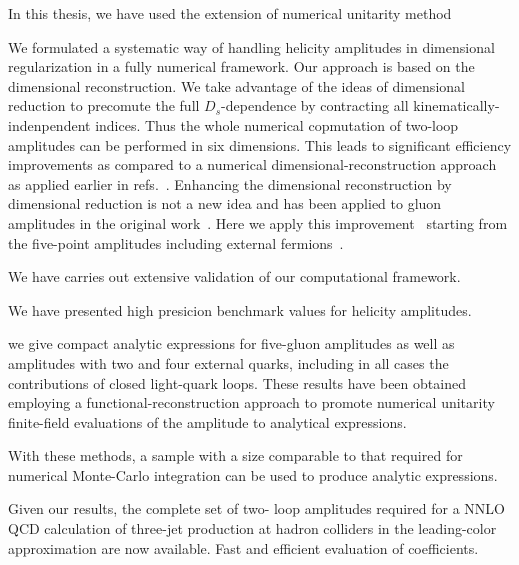 In this thesis, we have used the extension of numerical unitarity method  



We formulated a systematic way of handling helicity amplitudes in dimensional regularization in a fully numerical framework.
Our approach is based on the dimensional reconstruction. We take advantage of the ideas of dimensional reduction
to precomute the full $D_s$-dependence by contracting all kinematically-indenpendent indices.
Thus the whole numerical copmutation  of two-loop amplitudes can be performed in six dimensions.
This leads to
significant efficiency improvements as compared to a numerical dimensional-reconstruction
approach~\cite{Giele:2008ve,Ellis:2008ir, Boughezal:2011br} as applied earlier
in refs.~\cite{Abreu:2017xsl,Abreu:2017hqn,Badger:2018gip,Abreu:2018jgq}.
Enhancing the dimensional reconstruction by dimensional reduction 
is not a new idea and has been applied to gluon amplitudes in
the original work~\cite{Giele:2008ve}.
Here we apply this improvement~\cite{Anger:2018ove}
starting from the five-point amplitudes including external fermions~\cite{Abreu:2018jgq}.  


We have carries out extensive validation of our computational framework.

We have presented high presicion benchmark values for helicity amplitudes.

 we give compact
analytic expressions for five-gluon amplitudes as well as amplitudes with two and four
external quarks, including in all cases the contributions of closed light-quark loops.
These
results have been obtained employing a functional-reconstruction approach to promote
numerical unitarity  finite-field evaluations of the amplitude to analytical expressions.

With these methods, a sample with a size comparable to that required for
numerical Monte-Carlo integration
can be used to produce analytic expressions.

 Given our results, the complete set of two-
 loop amplitudes required for a NNLO QCD calculation of three-jet production at hadron
 colliders in the leading-color approximation are now available.
 Fast and efficient evaluation of coefficients.



